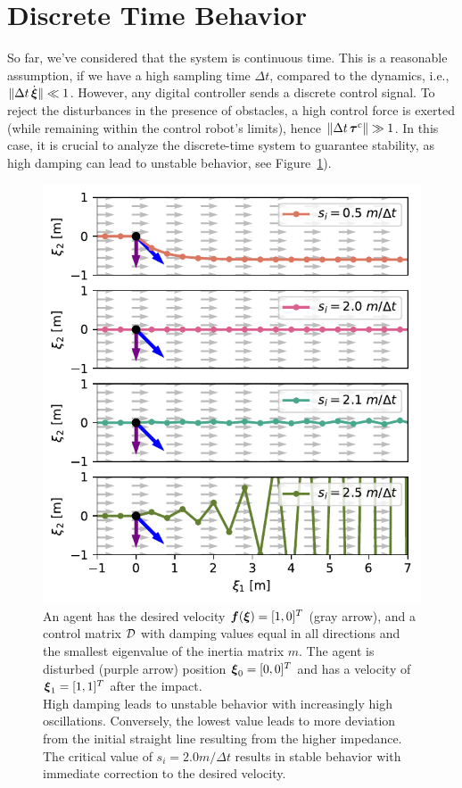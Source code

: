 \section{Discrete Time Behavior} \label{sec:discrete_time_behavior}
So far, we've considered that the system is continuous time. 
This is a reasonable assumption, if we have a high sampling time $\Delta t$, compared to the dynamics, i.e., $\| \Delta t \, \dot{\boldsymbol{\xi}} \| \ll 1$.
However, any digital controller sends a discrete control signal. To reject the disturbances in the presence of obstacles, a high control force is exerted (while remaining within the control robot's limits), hence $\| \Delta t \, \boldsymbol{\tau}^c \| \gg 1$. 
In this case, it is crucial to analyze the discrete-time system to guarantee stability, as high damping can lead to unstable behavior, see Figure~\ref{fig:discrete_controller_parameters_comparison}).

\begin{figure}[htbp]
\centering
  \includegraphics[width=\columnwidth]{figures/discrete_controller_parameters_comparison}
  \caption{An agent has the desired velocity $\boldsymbol{f}(\boldsymbol{\xi}) = [1, 0]^T$ (gray arrow), and a control matrix $\mathcal{D}$ with damping values equal in all directions and the smallest eigenvalue of the inertia matrix $m$. 
 The agent is disturbed (purple arrow) position $\boldsymbol{\xi}_0 = [0, 0]^T$ and has a velocity of  $\boldsymbol{\xi}_1 = [1, 1]^T$ after the impact. \\
  High damping leads to unstable behavior with increasingly high oscillations. Conversely, the lowest value leads to more deviation from the initial straight line resulting from the higher impedance. The critical value of $s_i = 2.0 m / \Delta t$ results in stable behavior with immediate correction to the desired velocity.}
  \label{fig:discrete_controller_parameters_comparison}
\end{figure}

